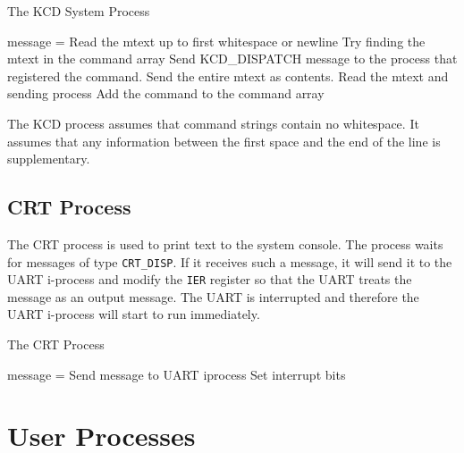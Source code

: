\documentclass[12pt]{report}
\begin{document}
\begin{algorithm}
  \caption{The KCD System Process}
  \begin{algorithmic}[1]
			\State message = 
				\State Read the mtext up to first whitespace or newline
				\State Try finding the mtext in the command array
					\State Send KCD_DISPATCH message to the process that registered the command. Send the entire mtext as contents.
				\EndIf
				\State Read the mtext and sending process
				\State Add the command to the command array
			\EndIf
			\State {}
		\EndWhile
    \EndProcedure
  \end{algorithmic}
\end{algorithm}

The KCD process assumes that command strings contain no whitespace. It assumes that any information between the first space and the end of the line is supplementary.\\

\subsection{CRT Process}

The CRT process is used to print text to the system console. The process waits for messages of type {\tt CRT\_DISP}. If it receives such a message, it will send it to the UART i-process and modify the {\tt IER} register so that the UART treats the message as an output message. The UART is interrupted and therefore the UART i-process will start to run immediately.\\

\begin{algorithm}
  \caption{The CRT Process}
  \begin{algorithmic}[1]
			\State message = 
				\State Send message to UART iprocess
				\State Set interrupt bits
			\Else
				\State {}
			\EndIf
		\EndWhile
    \EndProcedure
  \end{algorithmic}
\end{algorithm}


\section{User Processes}
\end{document}
